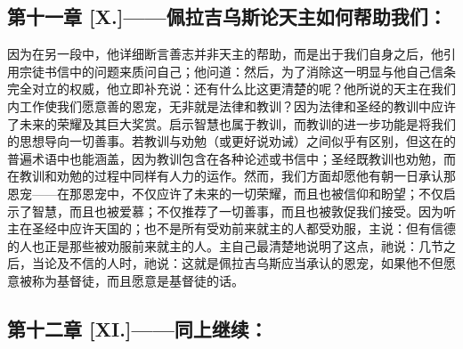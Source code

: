 
\subsection{第十一章 [X.]——佩拉吉乌斯论天主如何帮助我们：}

因为在另一段中，他详细断言善志并非天主的帮助，而是出于我们自身之后，他引用宗徒书信中的问题来质问自己；他问道：然后，为了消除这一明显与他自己信条完全对立的权威，他立即补充说：还有什么比这更清楚的呢？他所说的天主在我们内工作使我们愿意善的恩宠，无非就是法律和教训？因为法律和圣经的教训中应许了未来的荣耀及其巨大奖赏。启示智慧也属于教训，而教训的进一步功能是将我们的思想导向一切善事。若教训与劝勉（或更好说劝诫）之间似乎有区别，但这在的普遍术语中也能涵盖，因为教训包含在各种论述或书信中；圣经既教训也劝勉，而在教训和劝勉的过程中同样有人力的运作。然而，我们方面却愿他有朝一日承认那恩宠——在那恩宠中，不仅应许了未来的一切荣耀，而且也被信仰和盼望；不仅启示了智慧，而且也被爱慕；不仅推荐了一切善事，而且也被敦促我们接受。因为听主在圣经中应许天国的；也不是所有受劝前来就主的人都受劝服，主说：但有信德的人也正是那些被劝服前来就主的人。主自己最清楚地说明了这点，祂说：几节之后，当论及不信的人时，祂说：这就是佩拉吉乌斯应当承认的恩宠，如果他不但愿意被称为基督徒，而且愿意是基督徒的话。\par


\subsection{第十二章 [XI.]——同上继续：}


